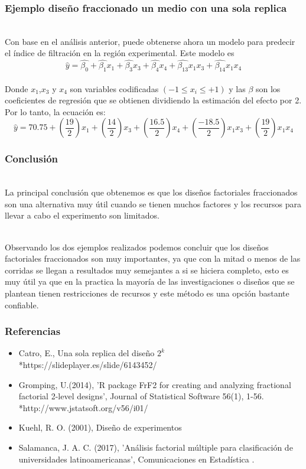 \documentclass[12pt]{beamer}
\begin{document}
\begin{frame}
\frametitle{Ejemplo diseño fraccionado un medio con una sola replica}
~\\Con base en el análisis anterior, puede obtenerse ahora un modelo para predecir el índice de filtración en la región experimental. Este modelo es
$$\hat{y}=\hat{\beta_0}+\hat{\beta_1}x_1+\hat{\beta_3}x_3+\hat{\beta_4}x_4+\hat{\beta_{13}}x_1x_3+\hat{\beta_{14}}x_1x_4$$
~\\Donde $x_1$,$x_3$ y $x_4$ son variables codificadas $(-1\leq x_i\leq +1)$ y las $\beta$ son los coeficientes de regresión que se obtienen dividiendo la estimación del efecto por 2. Por lo tanto, la ecuación es:
$$\hat{y}=70.75+\left(\frac{19}{2}\right)x_1+\left(\frac{14}{2}\right)x_3+\left(\frac{16.5}{2}\right)x_4+\left(\frac{-18.5}{2}\right)x_1x_3+\left(\frac{19}{2}\right)x_1x_4$$

\end{frame}

\begin{frame}
\frametitle{Conclusión}
~\\La principal conclusión que obtenemos es que los diseños factoriales fraccionados son una alternativa muy útil cuando se tienen muchos factores y los recursos para llevar a cabo el experimento son limitados.

~\\ Observando los dos ejemplos realizados podemos concluir que los diseños factoriales fraccionados son muy importantes, ya que con la mitad o menos de las corridas se llegan a resultados muy semejantes a si se hiciera completo, esto es muy útil ya que en la practica la mayoría de las investigaciones o diseños que se plantean tienen restricciones de recursos y este método es una opción bastante confiable.


\end{frame}



\begin{frame}
\frametitle{Referencias}
\begin{itemize}

\item Catro, E., Una sola replica del diseño $ 2^{k} $ 
*https://slideplayer.es/slide/6143452/


\item Gromping, U.(2014), 'R package FrF2 for creating and analyzing fractional factorial 2-level designs', Journal
of Statistical Software 56(1), 1-56.
*http://www.jstatsoft.org/v56/i01/


\item Kuehl, R. O. (2001), Diseño de experimentos

\item Salamanca, J. A. C. (2017), 'Análisis factorial múltiple para clasificación de universidades latinoamericanas', Comunicaciones en Estadística .
\end{itemize}
\end{frame}
\end{document}
